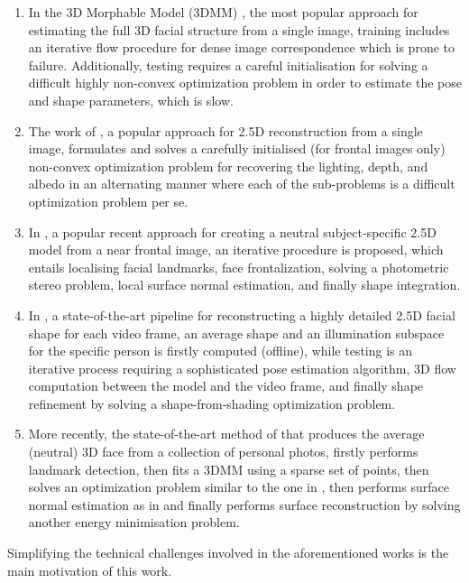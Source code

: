 \begin{enumerate}
\item In the 3D Morphable Model (3DMM) \cite{blanz1999morphable,
    romdhani2005estimating}, the most popular approach for estimating
  the full 3D facial structure from a single image, training includes
  an iterative flow procedure for dense image correspondence which is
  prone to failure. Additionally, testing requires a careful
  initialisation for solving a difficult highly non-convex
  optimization problem in order to estimate the pose and shape
  parameters, which is slow.
\item The work of \cite{kemelmacher20113d}, a popular approach for
  2.5D reconstruction from a single image, formulates and solves a
  carefully initialised (for frontal images only) non-convex
  optimization problem for recovering the lighting, depth, and albedo
  in an alternating manner where each of the sub-problems is a
  difficult optimization problem per se.
\item In \cite{kemelmacher2011face}, a popular recent approach for
  creating a neutral subject-specific 2.5D model from a near frontal
  image, an iterative procedure is proposed, which entails localising
  facial landmarks, face frontalization, solving a photometric stereo
  problem, local surface normal estimation, and finally shape
  integration.
\item In \cite{suwajanakorn2014total}, a state-of-the-art pipeline for
  reconstructing a highly detailed 2.5D facial shape for each video
  frame, an average shape and an illumination subspace for the
  specific person is firstly computed (offline), while testing is an
  iterative process requiring a sophisticated pose estimation
  algorithm, 3D flow computation between the model and the video
  frame, and finally shape refinement by solving a shape-from-shading
  optimization problem.
\item More recently, the state-of-the-art method of
  \cite{roth2016adaptive} that produces the average (neutral) 3D face
  from a collection of personal photos, firstly performs landmark
  detection, then fits a 3DMM using a sparse set of points, then
  solves an optimization problem similar to the one in
  \cite{kemelmacher2011face}, then performs surface normal estimation
  as in \cite{kemelmacher2011face} and finally performs surface
  reconstruction by solving another energy minimisation problem.
\end{enumerate}

Simplifying the technical challenges involved in the aforementioned
works is the main motivation of this work.

